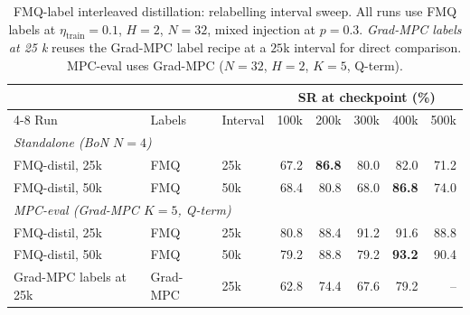 \begin{table}[h]
\centering
\caption{FMQ-label interleaved distillation: relabelling interval sweep. All runs use FMQ labels at $\eta_{\text{train}} = 0.1$,
   $H = 2$, $N = 32$, mixed injection at $p = 0.3$. \emph{Grad-MPC labels at 25 k} reuses the Grad-MPC label recipe at a $25$k interval for direct comparison. MPC-eval uses Grad-MPC ($N = 32$, $H = 2$, $K = 5$, Q-term).}
\label{tab:mpc-relabel-sweep}
\begin{tabular}{l l l r r r r r}
\toprule
& & & \multicolumn{5}{c}{SR at checkpoint (\%)} \\
\cmidrule(lr){4-8}
Run & Labels & Interval & 100k & 200k & 300k & 400k & 500k \\
\midrule
\multicolumn{8}{l}{\emph{Standalone (BoN $N = 4$)}} \\
FMQ-distil, 25k & FMQ      & 25k & 67.2 & \textbf{86.8} & 80.0 & 82.0 & 71.2 \\
FMQ-distil, 50k & FMQ      & 50k & 68.4 & 80.8           & 68.0 & \textbf{86.8} & 74.0 \\
\midrule
\multicolumn{8}{l}{\emph{MPC-eval (Grad-MPC $K = 5$, Q-term)}} \\
FMQ-distil, 25k & FMQ      & 25k & 80.8 & 88.4 & 91.2 & 91.6 & 88.8 \\
FMQ-distil, 50k & FMQ      & 50k & 79.2 & 88.8 & 79.2 & \textbf{93.2} & 90.4 \\
Grad-MPC labels at 25k & Grad-MPC & 25k & 62.8 & 74.4 & 67.6 & 79.2 & --   \\
\bottomrule
\end{tabular}
\end{table}

